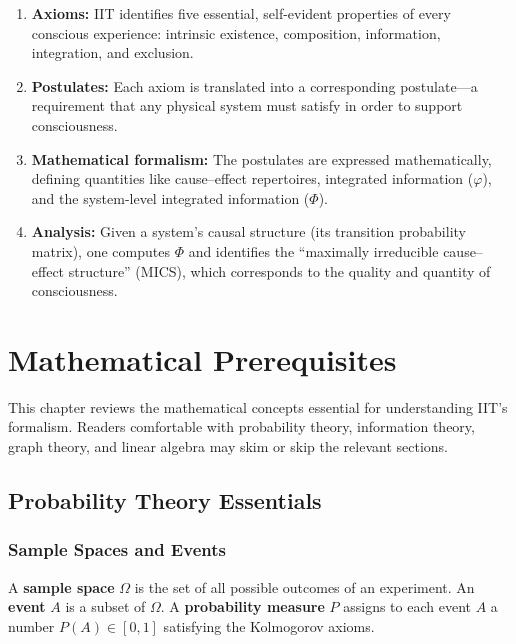 \documentclass[11pt,a4paper]{report}
\newcommand{\Phi}{\varPhi}
\begin{document}
\begin{enumerate}[leftmargin=2em, itemsep=4pt]
  \item \textbf{Axioms:} IIT identifies five essential, self-evident properties of every conscious experience: intrinsic existence, composition, information, integration, and exclusion.
  \item \textbf{Postulates:} Each axiom is translated into a corresponding postulate---a requirement that any physical system must satisfy in order to support consciousness.
  \item \textbf{Mathematical formalism:} The postulates are expressed mathematically, defining quantities like cause--effect repertoires, integrated information ($\varphi$), and the system-level integrated information ($\Phi$).
  \item \textbf{Analysis:} Given a system's causal structure (its transition probability matrix), one computes $\Phi$ and identifies the ``maximally irreducible cause--effect structure'' (MICS), which corresponds to the quality and quantity of consciousness.
\end{enumerate}


\chapter{Mathematical Prerequisites}

This chapter reviews the mathematical concepts essential for understanding IIT's formalism. Readers comfortable with probability theory, information theory, graph theory, and linear algebra may skim or skip the relevant sections.

\section{Probability Theory Essentials}

\subsection{Sample Spaces and Events}

A \textbf{sample space} $\Omega$ is the set of all possible outcomes of an experiment. An \textbf{event} $A$ is a subset of $\Omega$. A \textbf{probability measure} $P$ assigns to each event $A$ a number $P(A) \in [0, 1]$ satisfying the Kolmogorov axioms.
\end{document}
